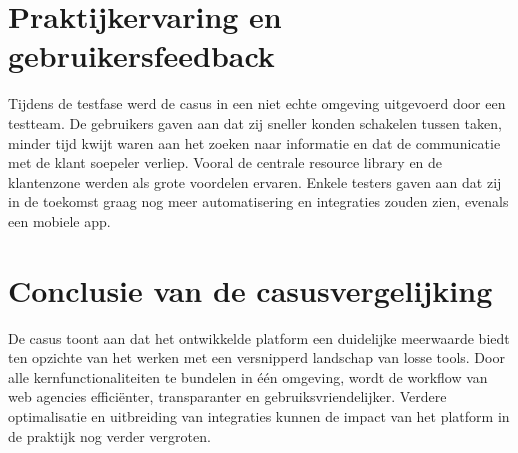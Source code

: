 \section{Praktijkervaring en gebruikersfeedback}
\label{sec:casus-feedback}

Tijdens de testfase werd de casus in een niet echte omgeving uitgevoerd door een testteam. De gebruikers gaven aan dat zij sneller konden schakelen tussen taken, minder tijd kwijt waren aan het zoeken naar informatie en dat de communicatie met de klant soepeler verliep. Vooral de centrale resource library en de klantenzone werden als grote voordelen ervaren. Enkele testers gaven aan dat zij in de toekomst graag nog meer automatisering en integraties zouden zien, evenals een mobiele app.

\section{Conclusie van de casusvergelijking}
\label{sec:casus-conclusie}

De casus toont aan dat het ontwikkelde platform een duidelijke meerwaarde biedt ten opzichte van het werken met een versnipperd landschap van losse tools. Door alle kernfunctionaliteiten te bundelen in één omgeving, wordt de workflow van web agencies efficiënter, transparanter en gebruiksvriendelijker. Verdere optimalisatie en uitbreiding van integraties kunnen de impact van het platform in de praktijk nog verder vergroten. 